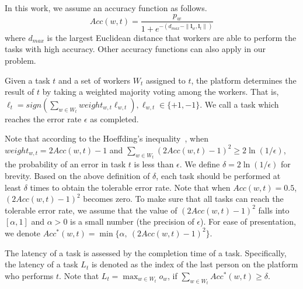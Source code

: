 In this work, we assume an accuracy function as follows.
\begin{equation}
\label{equ:predictAcc}
Acc(w, t) = \frac{p_w}{1 + e^{-(d_{max} - \|\boldsymbol{l}_w, \boldsymbol{l}_t\|)}}
\end{equation}
where $d_{max}$ is the largest Euclidean distance that workers are able to perform the tasks with high accuracy.
Other accuracy functions can also apply in our problem.

\begin{definition}
\label{def:tc}
Given a task $t$ and a set of workers $W_{t}$ assigned to $t$, the platform determines the result of $t$ by taking a weighted majority voting among the workers.
That is, $\ell_t = sign(\sum_{w \in W_{t}}{weight_{w,t} \ell_{w,t}}), \ell_{w,t} \in \{+1, -1\}$.
We call a task which reaches the error rate $\epsilon$ as completed.
\end{definition}

Note that according to the Hoeffding's inequality~\cite{Ho2013}, when $weight_{w,t} = 2Acc(w,t) - 1$ and $\sum_{w \in W_t}(2Acc(w,t) - 1)^2 \ge 2\ln(1/\epsilon)$, the probability of an error in task $t$ is less than $\epsilon$.
We define $\delta = 2\ln(1/\epsilon)$ for brevity.
Based on the above definition of $\delta$, each task should be performed at least $\delta$ times to obtain the tolerable error rate.
Note that when $Acc(w,t) = 0.5$, $(2Acc(w,t) - 1)^2$ becomes zero.
To make sure that all tasks can reach the tolerable error rate, we assume that the value of $(2Acc(w,t) - 1)^2$ falls into $[\alpha, 1]$ and $\alpha > 0$ is a small number (\eg the precision of $\epsilon$).
For ease of presentation, we denote $Acc^{*}(w,t) = \min\{\alpha,\ (2Acc(w,t) - 1)^2\}$.

\begin{definition}
\label{def:taskLatency}
The latency of a task is assessed by the completion time of a task.
Specifically, the latency of a task $L_t$ is denoted as the index of the last person on the platform who performs $t$.
Note that $L_t = \max_{w \in W_t} o_w$, if $\sum_{w \in W_t} Acc^{*}(w,t) \ge \delta$.
\end{definition}

